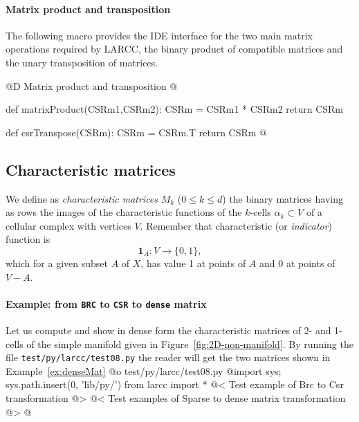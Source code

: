 \documentclass[11pt,oneside]{article}	%
\begin{document}
\paragraph{Matrix product and transposition}

The following macro provides the IDE interface for the two main matrix operations required by LARCC, the binary product of compatible matrices and the unary transposition of matrices.

@D Matrix product and transposition
@{def matrixProduct(CSRm1,CSRm2):
	CSRm = CSRm1 * CSRm2
	return CSRm

def csrTranspose(CSRm):
	CSRm = CSRm.T
	return CSRm
@}


\subsection{Characteristic matrices}

We define as \emph{characteristic matrices} $M_k$ ($0\leq k\leq d$) the binary matrices having as rows the images of the characteristic functions of the $k$-cells $\alpha_k\subset V$ of a cellular complex with vertices $V$.
Remember that characteristic (or \emph{indicator}) function is 
\[
\mathbf{1}_A\colon V \to \{0, 1\}, \qquad 
\]
which for a given subset $A$ of $X$, has value 1 at points of $A$ and 0 at points of $V - A$.
 
\paragraph{Example: from \texttt{BRC} to \texttt{CSR} to \texttt{dense} matrix} 
Let us compute and show in dense form the characteristic matrices of 2- and 1-cells of the simple manifold given in Figure~\ref{fig:2D-non-manifold}.
By running the file \texttt{test/py/larcc/test08.py} the reader will get the two matrices shown in Example~\ref{ex:denseMat}
@o test/py/larcc/test08.py
@{import sys; sys.path.insert(0, 'lib/py/')
from larcc import *
@< Test example of Brc to Csr transformation @>
@< Test examples of Sparse to dense matrix transformation @>
@}
 
\end{document}
